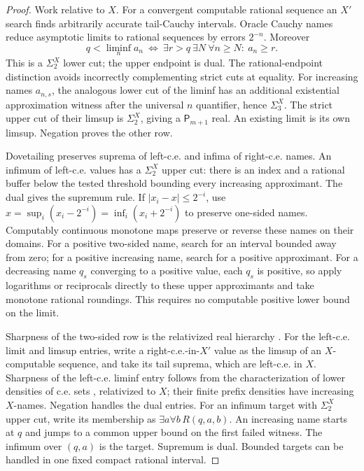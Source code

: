 \begin{proof}
Work relative to $X$. For a convergent computable rational sequence an
$X'$ search finds arbitrarily accurate tail-Cauchy intervals. Oracle
Cauchy names reduce asymptotic limits to rational sequences by errors
$2^{-n}$. Moreover
\[
 q<\liminf_n a_n\ \Longleftrightarrow\
 \exists r>q\ \exists N\ \forall n\geq N:\ a_n\geq r.
\]
This is a $\Sigma^X_2$ lower cut; the upper endpoint is dual. The
rational-endpoint distinction avoids incorrectly complementing strict
cuts at equality. For increasing names $a_{n,s}$, the analogous lower
cut of the liminf has an additional existential approximation witness
after the universal $n$ quantifier, hence $\Sigma^X_3$. The strict upper
cut of their limsup is $\Sigma^X_2$, giving a $\mathsf P_{m+1}$ real.
An existing limit is its own limsup. Negation proves the other row.

Dovetailing preserves suprema of left-c.e. and infima of right-c.e.
names. An infimum of left-c.e. values has a $\Sigma^X_2$ upper cut:
there is an index and a rational buffer below the tested threshold
bounding every increasing approximant. The dual gives the supremum
rule. If $|x_i-x|\leq2^{-i}$, use
$x=\sup_i(x_i-2^{-i})=\inf_i(x_i+2^{-i})$ to preserve one-sided names.
Computably continuous monotone maps preserve or reverse these names on
their domains. For a positive two-sided name, search for an interval
bounded away from zero; for a positive increasing name, search for a
positive approximant. For a decreasing name $q_s$ converging to a positive
value, each $q_s$ is positive, so apply logarithms or reciprocals directly
to these upper approximants and take monotone rational roundings. This
requires no computable positive lower bound on the limit.

Sharpness of the two-sided row is the relativized real hierarchy
\cite{zhengWeihrauch,density}. For the left-c.e. limit and limsup entries,
write a right-c.e.-in-$X'$ value as the limsup of an $X$-computable
sequence, and take its tail suprema, which are left-c.e. in $X$.
Sharpness of the left-c.e. liminf entry follows from the characterization
of lower densities of c.e. sets \cite[Theorem~5.7]{density}, relativized
to $X$; their finite prefix densities have increasing $X$-names.
Negation handles the dual entries. For an infimum target with
$\Sigma^X_2$ upper cut, write its membership as
$\exists a\forall b\,R(q,a,b)$. An increasing name starts at $q$ and
jumps to a common upper bound on the first failed witness. The infimum
over $(q,a)$ is the target. Supremum is dual. Bounded targets can be
handled in one fixed compact rational interval.
\end{proof}

